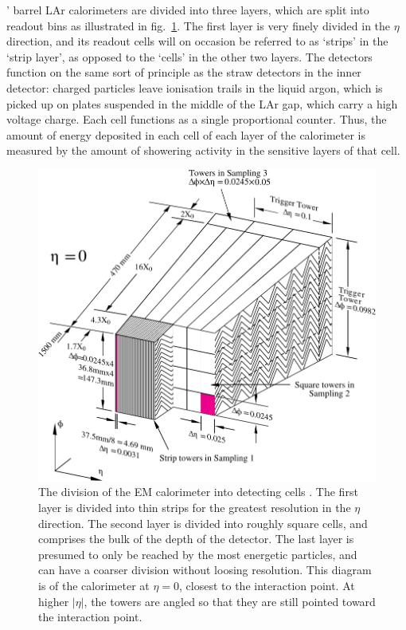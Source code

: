 \Atlas{}' barrel LAr calorimeters are divided into three layers, which are split into readout bins as illustrated in fig.~\ref{caldiv}. The first layer is very finely divided in the $\eta$ direction, and its readout cells will on occasion be referred to as `strips' in the `strip layer', as opposed to the `cells' in the other two layers. The detectors function on the same sort of principle as the straw detectors in the inner detector: charged particles leave ionisation trails in the liquid argon, which is picked up on plates suspended in the middle of the LAr gap, which carry a high voltage charge. Each cell functions as a single proportional counter. Thus, the amount of energy deposited in each cell of each layer of the calorimeter is measured by the amount of showering activity in the sensitive layers of that cell.

\begin{figure}[htp]
\begin{minipage}[b]{.69\textwidth}
\includegraphics[width=\textwidth]{caldiv}
\end{minipage}
\begin{minipage}[b]{.3\textwidth}
\caption{The division of the EM calorimeter into detecting cells \cite{egede}. The first layer is divided into thin strips for the greatest resolution in the $\eta$ direction. The second layer is divided into roughly square cells, and comprises the bulk of the depth of the detector. The last layer is presumed to only be reached by the most energetic particles, and can have a coarser division without loosing resolution. This diagram is of the calorimeter at $\eta = 0$, closest to the interaction point. At higher $|\eta|$, the towers are angled so that they are still pointed toward the interaction point.
\label{caldiv}}
\end{minipage}
\end{figure}

